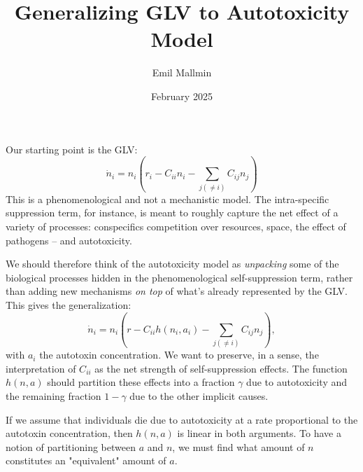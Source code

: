 \documentclass[11pt,a4paper,fleqn]{scrartcl}
\begin{document}
\title{Generalizing GLV to Autotoxicity Model}

\author{
	Emil Mallmin
}
\date{February 2025}
\maketitle  


Our starting point is the GLV:
\begin{equation}
\dot{n}_i = n_i\left( r_i - C_{ii} n_i - \sum_{j(\neq i)} C_{ij} n_j \right)
\end{equation}
This is a phenomenological and not a mechanistic model. The intra-specific suppression term, for instance, is meant to roughly capture the net effect of a variety of processes: conspecifics competition over resources, space, the effect of pathogens -- and autotoxicity. 

We should therefore think of the autotoxicity model as \emph{unpacking} some of the biological processes hidden in the phenomenological self-suppression term, rather than adding new mechanisms \emph{on top} of what's already represented by the GLV. This gives the generalization:
\begin{equation}
\dot{n}_i = n_i\left( r - C_{ii} h(n_i,a_i) - \sum_{j(\neq i)} C_{ij} n_j \right),
\end{equation}
with $a_i$ the autotoxin concentration. We want to preserve, in a sense, the interpretation of $C_{ii}$ as the net strength of self-suppression effects. The function $h(n,a)$ should partition these effects into a fraction $\gamma$ due to autotoxicity and the remaining fraction $1-\gamma$ due to the other implicit causes.

If we assume that individuals die due to autotoxicity at a rate proportional to the autotoxin concentration, then $h(n,a)$ is linear in both arguments. To have a notion of partitioning between $a$ and $n$, we must find what amount of $n$ constitutes an "equivalent" amount of $a$.
\end{document}
